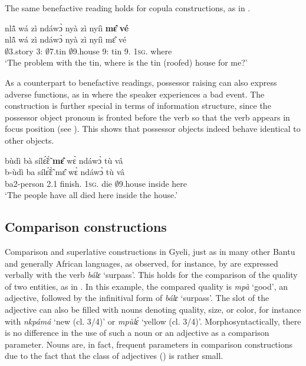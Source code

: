 \noindent The same benefactive reading holds for copula constructions, as in .

\ea \label{PR5}
  \glll     nlã̂ wá zì ndáwɔ̀ nyà zì nyíì {\bfseries mɛ̂} {\bfseries vé} \\
          nlã̂ wá zì ndáwɔ̀ nyà zì nyíì mɛ̂ vé \\
              $\emptyset$3.story 3:{\ATT} $\emptyset$7.tin $\emptyset$9.house 9:{\ATT} tin 9.{\COP} 1\textsc{sg}.{\OBJ} where\\
    \trans `The problem with the tin, where is the tin (roofed) house for me?'
\z

As a counterpart to benefactive readings, possessor raising can also express adverse functions, as in  where the speaker experiences a bad event. The construction is further special in terms of information structure, since the possessor object pronoun is fronted before the verb so that the verb appears in focus position (see ). This shows that possessor objects indeed behave identical to other objects.

\ea \label{PR6}
  \glll bùdì bà sílɛ̃́ɛ̃̀ {\bfseries mɛ̂} wɛ̀ ndáwɔ̀ tù vâ \\
        b-ùdì ba sílɛ̃́ɛ̃̀ mɛ̂ wɛ̀ ndáwɔ̀ tù vâ \\
       ba2-person 2.{\PST}1 finish.{\COMPL} 1\textsc{sg}.{\OBJ} die $\emptyset$9.house inside here\\
    \trans `The people have all died here inside the house.'
\z







\subsection{Comparison constructions}
\label{sec:CCx}


Comparison and superlative constructions in Gyeli, just as in many other Bantu and generally African languages, as observed, for instance, by \citet[157]{stassen84} are expressed verbally with the verb {\itshape bálɛ} `surpass'. This holds for the comparison of the quality of two entities, as in . In this example, the compared quality is {\itshape mpà} `good', an adjective, followed by the infinitival form of {\itshape bálɛ} `surpass'. The slot of the adjective can also be filled with nouns denoting quality, size, or color, for instance with {\itshape nkpámá} `new (cl. 3/4)' or {\itshape mpùlɛ́} `yellow (cl. 3/4)'. Morphosyntactically, there is no difference in the use of such a noun or an adjective as a comparison parameter. Nouns are, in fact, frequent parameters in comparison constructions due to the fact that the class of adjectives () is rather small. 

